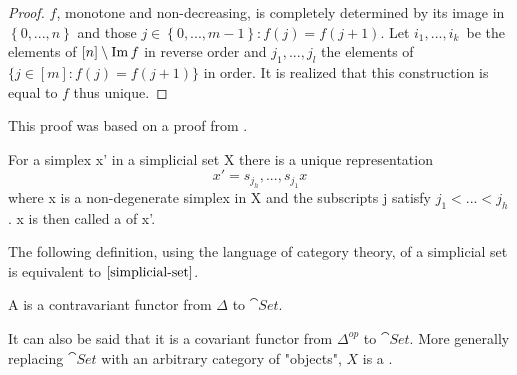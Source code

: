 \documentclass[../../main.tex]{subfiles}
\begin{document}
    \begin{proof}
        $f$, monotone and non-decreasing, is completely determined by its image in $\left\{ 0,...,n \right\}$ and those $j\in \left\{0,...,m-1 \right\}:f(j) = f(j+1)$. Let $i_1, ..., i_k$ be the elements of $[n] \setminus \operatorname{Im} f$ in reverse order and $j_1, ..., j_l$ the elements of $\{j \in [m]: f(j) = f(j+1)\}$ in order. It is realized that this construction is equal to $f$ thus unique.
    \end{proof}

    This proof was based on a proof from \cite{simp-maye}.

    \begin{corollary}\label{uni-sim}
        For a simplex x' in a simplicial set X there is a unique representation
        \[x' = s_{j_h},...,s_{j_1}x\]
        where x is a non-degenerate simplex in X and the subscripts j satisfy $j_1 <... < j_h$. x is then called a  of x'.
    \end{corollary}

    The following definition, using the language of category theory, of a simplicial set is equivalent to $\ref{simplicial-set}$.

    \begin{definition}
        A  is a contravariant functor from $\Delta$ to $\cat{Set}$.
    \end{definition}

    It can also be said that it is a covariant functor from $\Delta^{op}$ to $\cat{Set}$. More generally replacing $\cat{Set}$ with an arbitrary category of "objects", $X$ is a . 
    
\end{document}
